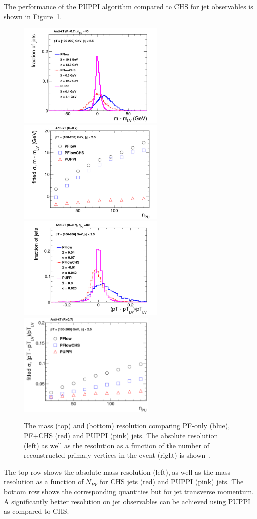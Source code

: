 The performance of the PUPPI algorithm compared to CHS for jet observables is shown in Figure~\ref{fig:objreco:puppi}.
\begin{figure}[h!] 
    \centering
    \includegraphics[height=5cm]{figures/event_reconstruction/puppi_mres_hiPt.pdf}
    \includegraphics[height=5cm]{figures/event_reconstruction/puppi_mresVsPu.pdf}\\
    \includegraphics[height=5cm]{figures/event_reconstruction/puppi_ptres_hiPt.pdf}
    \includegraphics[height=5cm]{figures/event_reconstruction/puppi_ptresVsPu.pdf}
    \caption{The mass (top) and \PT (bottom) resolution comparing PF-only (blue), PF+CHS (red) and PUPPI (pink) jets. The absolute resolution (left) as well as the resolution as a function of the number of reconstructed primary vertices in the event (right) is shown~\cite{Bertolini2014}.}
    \label{fig:objreco:puppi}
\end{figure}
The top row shows the absolute mass resolution (left), as well as the mass resolution as a function of $N_{PV}$ for CHS jets (red) and PUPPI (pink) jets. The bottom row shows the corresponding quantities but for jet transverse momentum. A significantly better resolution on jet observables can be achieved using PUPPI as compared to CHS.

